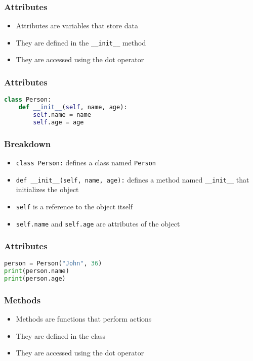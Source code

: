 \documentclass[serif, 9pt, aspectratio=32]{beamer}
\begin{document}
\begin{frame}
    \centering
    \frametitle{Attributes}
    \begin{itemize}
        \setlength{\itemsep}{2em}
        \item Attributes are variables that store data
        \item They are defined in the \texttt{\_\_init\_\_} method
        \item They are accessed using the dot operator
    \end{itemize}
\end{frame}

\begin{frame}[fragile]
    \frametitle{Attributes}
    \begin{lstlisting}[language=Python]
class Person:
    def __init__(self, name, age):
        self.name = name
        self.age = age
    \end{lstlisting}
\end{frame}

\begin{frame}
    \centering
    \frametitle{Breakdown}
    \begin{itemize}
        \setlength{\itemsep}{2em}
        \item \texttt{class Person:} defines a class named \texttt{Person}
        \item \texttt{def \_\_init\_\_(self, name, age):} defines a method named \texttt{\_\_init\_\_} that initializes the object
        \item \texttt{self} is a reference to the object itself
        \item \texttt{self.name} and \texttt{self.age} are attributes of the object
    \end{itemize}
\end{frame}

\begin{frame}[fragile]
    \frametitle{Attributes}
    \begin{lstlisting}[language=Python]
person = Person("John", 36)
print(person.name)
print(person.age)
    \end{lstlisting}
\end{frame}

\begin{frame}
    \centering
    \frametitle{Methods}
    \begin{itemize}
        \setlength{\itemsep}{2em}
        \item Methods are functions that perform actions
        \item They are defined in the class
        \item They are accessed using the dot operator
    \end{itemize}
\end{frame}
\end{document}
